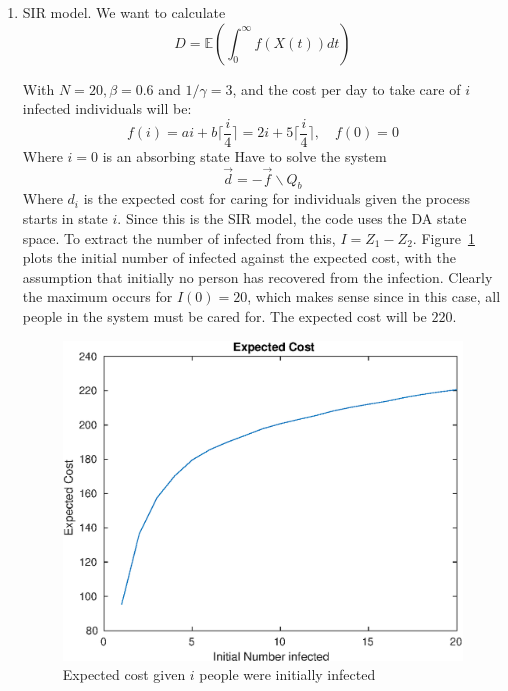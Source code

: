 \documentclass{/home/janmebows/Documents/LatexTemplates/myassignment}
\begin{document}
\begin{enumerate}
\begin{enumerate}[label=(\roman*)]
				
				
	
		\item %
				SIR model.	 We want to calculate 
				\[D = \mathbb{E}\left(\int_0^\infty f(X(t)) dt\right)\]
			 							
			With $N=20, \beta = 0.6$ and $1/\gamma = 3$, and the cost per day to take care of $i$ infected individuals will be:
			\[f(i) = ai + b\lceil\frac{i}{4}\rceil = 2i + 5\lceil\frac{i}{4}\rceil,\quad f(0) =0  \]
			Where $i=0$ is an absorbing state
			Have to solve the system 
			\[\vec d = -\vec f \backslash Q_b\]
			Where $d_i$ is the expected cost for caring for individuals given the process starts in state $i$.
			Since this is the SIR model, the code uses the DA state space. To extract the number of infected from this, $I = Z_1 - Z_2$. Figure~\ref{fig:expectedCost} plots the initial number of infected against the expected cost, with the assumption that initially no person has recovered from the infection. Clearly the maximum occurs for $I(0) = 20$, which makes sense since in this case, all people in the system must be cared for.
			The expected cost will be $220$.

			\begin{figure}[h]
				\centering
				\label{fig:expectedCost}
				\includegraphics[width=\linewidth]{TopicBA2Q32}
				\caption{Expected cost given $i$ people were initially infected}
				
			\end{figure}
	\end{enumerate}
\end{enumerate}
\end{document}
